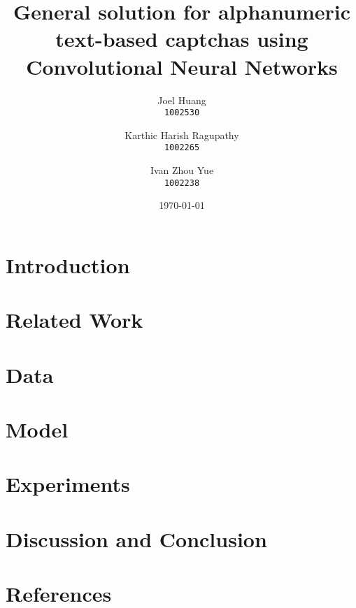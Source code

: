 \documentclass[9pt,twocolumn]{article}
\title{
	General solution for alphanumeric text-based captchas using Convolutional Neural Networks\\
}
\author{
  Joel Huang\\
  \texttt{1002530}
  \and
  Karthic Harish Ragupathy\\
  \texttt{1002265}
  \and
  Ivan Zhou Yue\\
  \texttt{1002238}
}
\date{\today}
\begin{document}
\maketitle

\begin{abstract}
\end{abstract}

\section{Introduction}
\section{Related Work}
\section{Data}
\section{Model}
\section{Experiments}
\section{Discussion and Conclusion}
\section{References}
\end{document}
